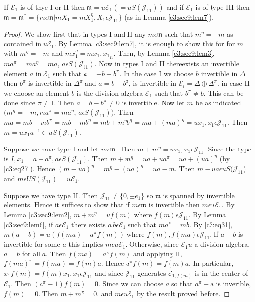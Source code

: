 \begin{lemma}\label{c3:sec9:lem10}
If $\mathcal{E}_1$ is of thye I or II then
$\mathfrak{m}=u\mathcal{E}_1(=uS(\mathscr{J}_{11}))$ and if
$\mathcal{E}_1$ is of type III then
$\mathfrak{m}=\mathfrak{m}^{\ast}=\{m\epsilon \mathfrak{m}|mX_1=m
X_1^{\eta},X_1\epsilon \mathscr{J}_{11}\}$ (as in Lemma \ref{c3:sec9:lem7}).
\end{lemma}

\begin{proof}
We show first that in types I and II any $m\epsilon \mathfrak{m}$ such
that $m^{\eta}=-m$ as contained in $u\mathcal{E}_1$. By Lemma
\ref{c3:sec9:lem7}, it
is enough to show this for for $m$ with $m^{\eta}=-m$ and
$mx^{\eta}_1=mx_1,x_{1_{11}}$. Then, by Lemma \ref{c3:sec9:lem3},
$ma^{\pi}=ma^{\eta}=ma$, $a\epsilon S(\mathscr{J}_{11})$. Now in
types I and II there\pageoriginale exists an invertible element $a$ in
$\mathcal{E}_1$ such that $a=+b-b^{\pi}$. In the case I we choose $b$
invertible in $\Delta$ then $b^{\pi}$ is invertible in $\Delta^{\pi}$
and $a=b-b^{\pi}$, is invertible in
$\mathcal{E}_i=\Delta\oplus\Delta^{\pi}$. in case II we choose an
element $b$ is the division algebra $\mathscr{E}_1$ such that
$b^{\pi}\neq b$. This can be done since $\pi\neq 1$. Then
$a=b-b^{\pi}\neq 0$ is invertible. Now let $m$ be as indicated
$(m^{\eta}=-m, ma^{\pi}=ma^{\eta}$, $a\epsilon
S(\mathscr{J}_{11}))$. Then
$ma=mb-mb^{\pi}=mb-mb^{\eta}=mb+m^{\eta}b^{\eta}=ma+(ma)^{\eta}=ux_1,x_1\epsilon
\mathscr{J}_{11}$. Then $m=ux_1a^{-1}\in u S(\mathscr{J}_{11})$.

Suppose we have type I and let $m\epsilon \mathfrak{m}$. Then
$m+m^{\eta}=ux_1, x_1\epsilon \mathscr{J}_{11}$. Since the type is $I,
x_1=a+a^{\pi}, a\epsilon S(\mathscr{J}_{11})$. Then
$m+m^{\eta}=ua+ua^{\pi}=ua+(ua)^{\eta}$ (by \eqref{c3:eq27}). Hence
$(m-ua)^{\eta}=m^{\eta}-(ua)^{\eta}=ua-m$. Then $m-ua \epsilon
uS(\mathscr{J}_{11}$) and $m\epsilon
US(\mathscr{J}_{11})=u\mathcal{E}_1$.

Suppose we have type II. Then $\mathscr{J}_{11}\neq \{0,\pm e_1\}$ so
$\mathfrak{m}$ is spanned by invertible elements. Hence it suffices to
show that if $m\epsilon \mathfrak{m}$ is invertible then $m\epsilon
u\mathcal{E}_1$. By Lemma \ref{c3:sec9:lem2}, $m+m^{\eta}=uf(m)$ where $f(m)\epsilon
\mathscr{J}_{11}$. By Lemma \ref{c3:sec9:lem6}, if $a\epsilon \mathcal{E}_1$ there
exists $a\, b\epsilon \mathcal{E}_1$ such that $ma^{\eta}=mb$. By
\eqref{c3:eq31}, $m(a-b)=u(f(ma)-a^{\pi}f(m))$ where $f(m), f(ma)\epsilon
\mathscr{J}_{11}$. If $a-b$ is invertible for some $a$ this implies
$m\epsilon u\mathcal{E}_1$. Otherwise, since $\mathcal{E}_1 u$  a
division algebra, $a=b$ for all $a$. Then $f(ma)=a^{\pi}f(m)$ and
applying II, $f(ma)^{\pi}=f(ma)=f(m)a$. Hence $a^{\pi}f(m)=f(m)a$. In
particular, $x_1f(m)=f(m)x_1, x_1\epsilon \mathscr{J}_{11}$ and since
$\mathscr{J}_{11}$ generates $\mathcal{E}_{1, f(m)}$ is in the center
of $\mathcal{E}_1$. Then $(a^{\pi}-1)f(m)=0$. Since we can choose $a$ so
that $a^{\pi}-a$ is inverible, $f(m)=0$. Then $m+m^{\pi}=0$. and
$m\epsilon u\mathcal{E}_1$ by the result proved before.


\end{proof}
